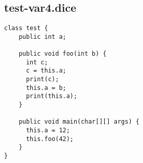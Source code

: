 \subsection{test-var4.dice}
\begin{verbatim}
class test {
	public int a;

	public void foo(int b) {
	  int c;
	  c = this.a;
	  print(c);
	  this.a = b;
	  print(this.a);
	}

	public void main(char[][] args) {
	  this.a = 12;
	  this.foo(42);
	}
}
\end{verbatim}